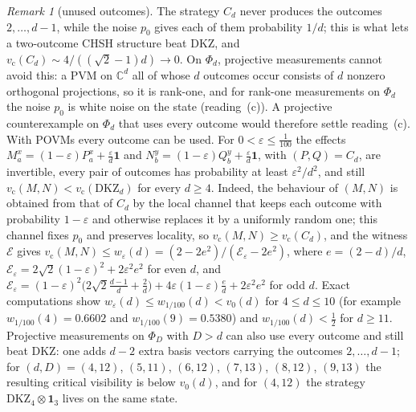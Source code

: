 \documentclass[11pt]{amsart}
\theoremstyle{definition}
\theoremstyle{remark}
\newtheorem{remark}[theorem]{Remark}
\numberwithin{equation}{section}
\newcommand{\C}{\mathbb{C}}
\newcommand{\one}{\mathbf{1}}
\newcommand{\vc}{v_{\mathrm c}}
\newcommand{\DKZ}{\mathrm{DKZ}}
\begin{document}
\begin{remark}[unused outcomes]\label{rem:scope}
The strategy $C_d$ never produces the outcomes $2,\dots,d-1$, while the noise $p_0$ gives each of them probability
$1/d$; this is what lets a two-outcome CHSH structure beat DKZ, and $\vc(C_d)\sim4/((\sqrt2-1)d)\to0$. On $\Phi_d$,
projective measurements cannot avoid this: a PVM on $\C^d$ all of whose $d$ outcomes occur consists of $d$ nonzero
orthogonal projections, so it is rank-one, and for rank-one measurements on $\Phi_d$ the noise $p_0$ is white noise on
the state (reading~(c)). A projective counterexample on $\Phi_d$ that uses every outcome would therefore settle
reading~(c). With POVMs every outcome can be used. For $0<\varepsilon\le\frac1{100}$ the effects
$M^x_a=(1-\varepsilon)P^x_a+\frac\varepsilon d\one$ and $N^y_b=(1-\varepsilon)Q^y_b+\frac\varepsilon d\one$, with
$(P,Q)=C_d$, are invertible, every pair of outcomes has probability at least $\varepsilon^2/d^2$, and still
$\vc(M,N)<\vc(\DKZ_d)$ for every $d\ge4$. Indeed, the behaviour of $(M,N)$ is obtained from that of $C_d$ by the local
channel that keeps each outcome with probability $1-\varepsilon$ and otherwise replaces it by a uniformly random one;
this channel fixes $p_0$ and preserves locality, so $\vc(M,N)\ge\vc(C_d)$, and the witness $\mathcal E$ gives
$\vc(M,N)\le w_\varepsilon(d)=(2-2e^2)/(\mathcal E_\varepsilon-2e^2)$, where $e=(2-d)/d$,
$\mathcal E_\varepsilon=2\sqrt2(1-\varepsilon)^2+2\varepsilon^2e^2$ for even $d$, and
$\mathcal E_\varepsilon=(1-\varepsilon)^2\bigl(2\sqrt2\frac{d-1}d+\frac2d\bigr)+4\varepsilon(1-\varepsilon)\frac ed+2\varepsilon^2e^2$
for odd $d$. Exact computations show $w_\varepsilon(d)\le w_{1/100}(d)<v_0(d)$ for $4\le d\le10$ (for example
$w_{1/100}(4)=0.6602$ and $w_{1/100}(9)=0.5380$) and $w_{1/100}(d)<\frac12$ for $d\ge11$. Projective measurements on
$\Phi_D$ with $D>d$ can also use every outcome and still beat DKZ: one adds $d-2$ extra basis vectors carrying the
outcomes $2,\dots,d-1$; for $(d,D)=(4,12)$, $(5,11)$, $(6,12)$, $(7,13)$, $(8,12)$, $(9,13)$ the resulting critical
visibility is below $v_0(d)$, and for $(4,12)$ the strategy $\DKZ_4\otimes\one_3$ lives on the same state.
\end{remark}
\end{document}
